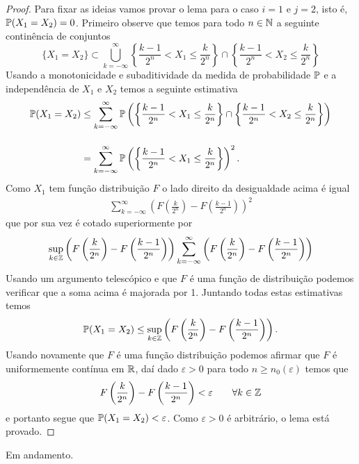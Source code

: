 \begin{proof}
Para fixar as ideias vamos provar o lema para 
o caso $i=1$ e $j=2$, isto é, $\P(X_1=X_2)=0$.
Primeiro observe que temos para todo $n\in\N$ 
a seguinte continência de conjuntos 
	\[
	\{X_1=X_2\}
	\subset
	\bigcup_{k=-\infty}^{\infty}
	\left\{
		\frac{k-1}{2^n}<X_1\leq \frac{k}{2^n}
	\right\}
	\cap
	\left\{
		\frac{k-1}{2^n}<X_2\leq \frac{k}{2^n}
	\right\}
	\]
Usando a monotonicidade e subaditividade da medida
de probabilidade $\P$ e a independência de 
$X_1$ e $X_2$ temos a seguinte estimativa
	\begin{align*}
	\P(X_1=X_2)
	&\leq
	\sum_{k=-\infty}^{\infty}
	\P \left(
		\left\{
			\frac{k-1}{2^n}<X_1\leq \frac{k}{2^n}
		\right\}
		\cap
		\left\{
			\frac{k-1}{2^n}<X_2\leq \frac{k}{2^n}
		\right\}
	\right)
	\\[0.4cm]
	&=
	\sum_{k=-\infty}^{\infty}
	\P \left(
		\left\{
			\frac{k-1}{2^n}<X_1\leq \frac{k}{2^n}
		\right\}
	\right)^2.
	\end{align*}
%
%
%
Como $X_1$ tem função distribuição $F$ o lado 
direito da desigualdade acima é igual 
	\begin{align*}
	\sum_{k=-\infty}^{\infty}
	\left(
		F\left(\frac{k}{2^n}\right)
		-
		F\left(\frac{k-1}{2^n}\right)
	\right)^2
	\end{align*}
que por sua vez é cotado superiormente por 
	\begin{align*}
	\sup_{k\in\Z}
		\left(
			F\left(\frac{k}{2^n}\right)
			-
			F\left(\frac{k-1}{2^n}\right)
		\right)
	\sum_{k=-\infty}^{\infty}
	\left(
		F\left(\frac{k}{2^n}\right)
		-
		F\left(\frac{k-1}{2^n}\right)
	\right)	
	\end{align*}
Usando um argumento telescópico e que $F$ é uma 
função de distribuição podemos verificar que a soma
acima é majorada por 1. Juntando todas estas estimativas
temos
	\begin{align*}
	\P(X_1=X_2)
	\leq 
	\sup_{k\in\Z}
		\left(
			F\left(\frac{k}{2^n}\right)
			-
			F\left(\frac{k-1}{2^n}\right)
		\right).
	\end{align*}
 Usando novamente que $F$ é uma função distribuição podemos
 afirmar que $F$ é uniformemente contínua em $\R$, daí dado 
 $\varepsilon>0$ para todo $n\geq n_0(\varepsilon)$ temos que 
	\[
			F\left(\frac{k}{2^n}\right)
			-
			F\left(\frac{k-1}{2^n}\right)
			< 
			\varepsilon
			\qquad
			\forall k\in\Z
	\]  
e portanto segue que $\P(X_1=X_2)< \varepsilon$. 
Como $\varepsilon>0$ é arbitrário, 
o lema está provado.
\end{proof}


\begin{center}
	{\red Em andamento.}
\end{center}


